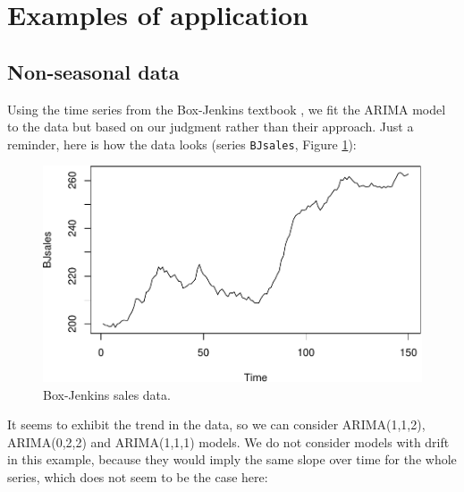 \documentclass[]{book}
\theoremstyle{definition}
\theoremstyle{definition}
\theoremstyle{definition}
\theoremstyle{definition}
\theoremstyle{remark}
\begin{document}
\hypertarget{ARIMAExampleInR}{%
\section{Examples of application}\label{ARIMAExampleInR}}

\hypertarget{non-seasonal-data-2}{%
\subsection{Non-seasonal data}\label{non-seasonal-data-2}}

Using the time series from the Box-Jenkins textbook \citep{Box1976}, we fit the ARIMA model to the data but based on our judgment rather than their approach. Just a reminder, here is how the data looks (series \texttt{BJsales}, Figure \ref{fig:BJSalesPlot}):

\begin{figure}
\centering
\includegraphics{Svetunkov--2022----ADAM_files/figure-latex/BJSalesPlot-1.pdf}
\caption{\label{fig:BJSalesPlot}Box-Jenkins sales data.}
\end{figure}

It seems to exhibit the trend in the data, so we can consider ARIMA(1,1,2), ARIMA(0,2,2) and ARIMA(1,1,1) models. We do not consider models with drift in this example, because they would imply the same slope over time for the whole series, which does not seem to be the case here:
\end{document}
